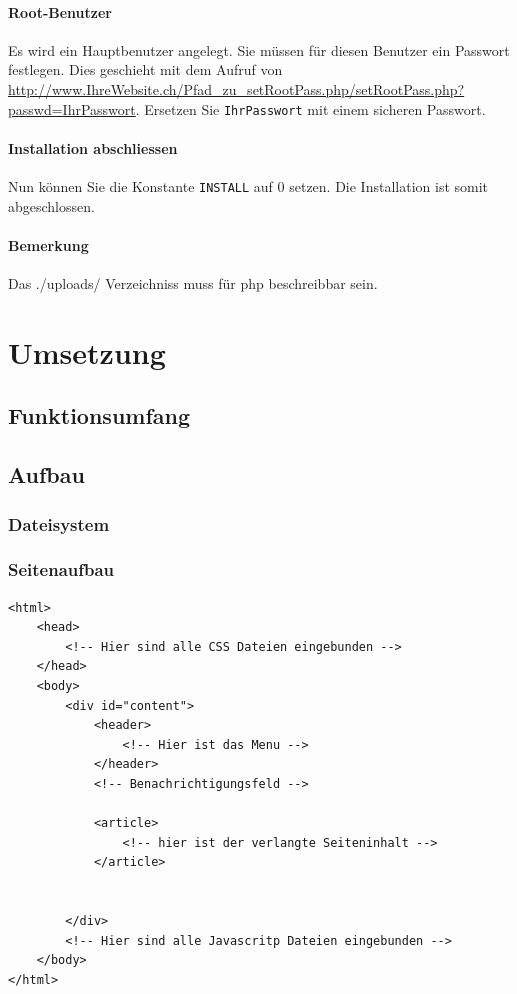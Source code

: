\documentclass[ngerman, 12pt, pdftex]{scrartcl}[2006/07/30]
\begin{document}
	\paragraph{Root-Benutzer}
		Es wird ein Hauptbenutzer angelegt. Sie müssen für diesen Benutzer ein Passwort festlegen. 
		Dies geschieht mit dem Aufruf von \url{http://www.IhreWebsite.ch/Pfad_zu_setRootPass.php/setRootPass.php?passwd=IhrPasswort}.
		Ersetzen Sie \verb+IhrPasswort+ mit einem sicheren Passwort.
	\paragraph{Installation abschliessen}
		Nun können Sie die Konstante \verb+INSTALL+ auf 0 setzen. Die Installation ist somit abgeschlossen.
		\paragraph{Bemerkung}
    Das ./uploads/ Verzeichniss muss für php beschreibbar sein.
  





\section{Umsetzung}
\subsection{Funktionsumfang}


\subsection{Aufbau}
	\subsubsection{Dateisystem}
		
	\subsubsection{Seitenaufbau}
	\lstset{language=html}
\begin{lstlisting}
<html>
	<head>
		<!-- Hier sind alle CSS Dateien eingebunden -->
	</head>
	<body>
		<div id="content">
			<header>
				<!-- Hier ist das Menu -->
			</header>
			<!-- Benachrichtigungsfeld -->
			
			<article>
				<!-- hier ist der verlangte Seiteninhalt -->
			</article>
					
					
		</div>
		<!-- Hier sind alle Javascritp Dateien eingebunden -->
	</body>
</html>
	\end{lstlisting}
	
\end{document}

